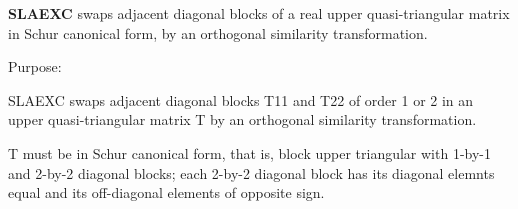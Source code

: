{\bfseries S\+L\+A\+E\+X\+C} swaps adjacent diagonal blocks of a real upper quasi-\/triangular matrix in Schur canonical form, by an orthogonal similarity transformation. 

 \begin{DoxyParagraph}{Purpose\+: }
\begin{DoxyVerb} SLAEXC swaps adjacent diagonal blocks T11 and T22 of order 1 or 2 in
 an upper quasi-triangular matrix T by an orthogonal similarity
 transformation.

 T must be in Schur canonical form, that is, block upper triangular
 with 1-by-1 and 2-by-2 diagonal blocks; each 2-by-2 diagonal block
 has its diagonal elemnts equal and its off-diagonal elements of
 opposite sign.\end{DoxyVerb}
 
\end{DoxyParagraph}

